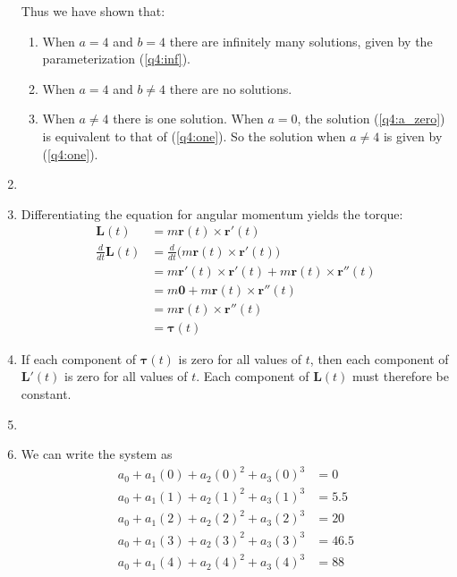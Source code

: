 \documentclass{article}
\begin{document}
\begin{enumerate}
Thus we have shown that:
\begin{enumerate}
\item When $a = 4$ and $b = 4$ there are infinitely many solutions, given
by the parameterization (\ref{q4:inf}).
\item When $a = 4$ and $b \neq 4$ there are no solutions.
\item When $a \neq 4$ there is one solution.  When $a = 0$, the 
solution (\ref{q4:a_zero}) is equivalent to that of (\ref{q4:one}).  
So the solution when $a \neq 4$ is given by (\ref{q4:one}).
\end{enumerate}
\item
\BEN
\item Differentiating the equation for angular momentum yields the torque:
\begin{align*}
\mathbf{L}(t) &= m\mathbf{r}(t)\times \mathbf{r}'(t) \\
\frac{d}{dt}\mathbf{L}(t) &= \frac{d}{dt} \Big(m\mathbf{r}(t)\times \mathbf{r}'(t) \Big)\\
&=m\mathbf{r}'(t)\times \mathbf{r}'(t) + m\mathbf{r}(t)\times \mathbf{r}''(t) \\
&=m\mathbf{0}  + m\mathbf{r}(t)\times \mathbf{r}''(t) \\
&=m\mathbf{r}(t)\times \mathbf{r}''(t) \\
&= \boldsymbol\tau(t)
\end{align*}
\item If each component of $\mathbf{\tau}(t)$ is zero for all values of $t$, then each component of $\mathbf{L}'(t)$ is zero for all values of $t$. Each component of $\mathbf{L}(t)$ must therefore be constant. 
\EEN
\item
\BEN
\item
We can write the system as
\begin{align*}
a_0+a_1(0)+a_2(0)^2 +a_3(0)^3 &= 0 \\
a_0+a_1(1)+a_2(1)^2 +a_3(1)^3 &= 5.5 \\
a_0+a_1(2)+a_2(2)^2 +a_3(2)^3&= 20  \\
a_0+a_1(3)+a_2(3)^2 +a_3(3)^3 &= 46.5 \\
a_0+a_1(4)+a_2(4)^2 +a_3(4)^3 &= 88 \\ 
\end{align*}

\end{enumerate}
\end{document}
